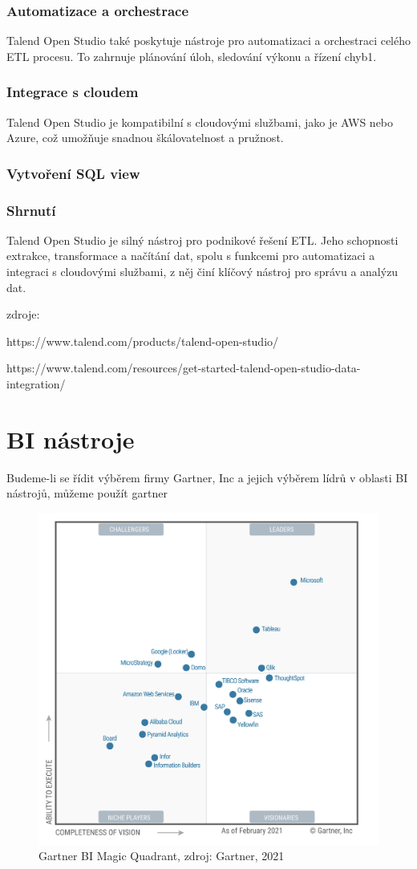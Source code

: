 \subsubsection{Automatizace a orchestrace}
Talend Open Studio také poskytuje nástroje pro automatizaci a orchestraci celého ETL procesu. To zahrnuje plánování úloh, sledování výkonu a řízení chyb1.

\subsubsection{Integrace s cloudem}
Talend Open Studio je kompatibilní s cloudovými službami, jako je AWS nebo Azure, což umožňuje snadnou škálovatelnost a pružnost.

\subsubsection{Vytvoření SQL view}


\subsubsection{Shrnutí}
Talend Open Studio je silný nástroj pro podnikové řešení ETL. Jeho schopnosti extrakce, transformace a načítání dat, spolu s funkcemi pro automatizaci a integraci s cloudovými službami, z něj činí klíčový nástroj pro správu a analýzu dat.

zdroje:

https://www.talend.com/products/talend-open-studio/

https://www.talend.com/resources/get-started-talend-open-studio-data-integration/


\section{BI nástroje}\label{sec:BITools}

Budeme-li se řídit výběrem firmy Gartner, Inc\cite{FIG:BiTools} a jejich výběrem lídrů v oblasti BI nástrojů, můžeme použít gartner

\begin{figure}[hp]
    \centering
    \includegraphics[width=0.6\linewidth]{img/gartner-BI-tools.png}
    \caption{Gartner BI Magic Quadrant, zdroj: Gartner, 2021}
    \label{fig:BITools}
\end{figure}

